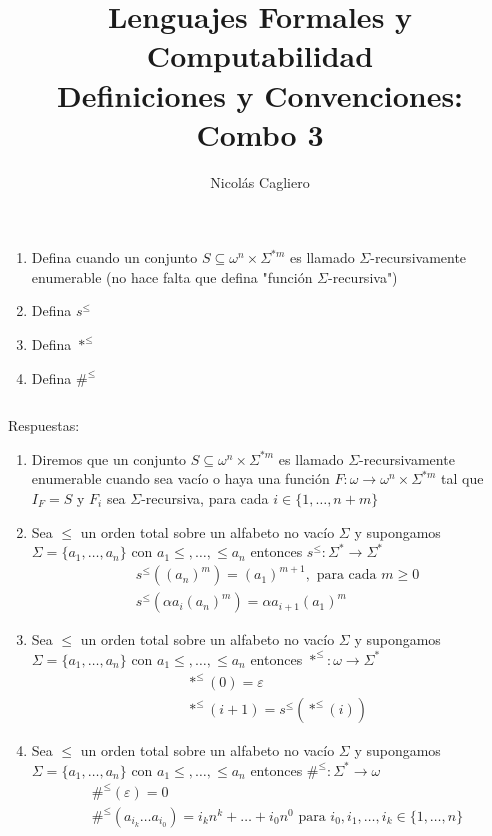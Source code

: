 \documentclass{article}
\title{Lenguajes Formales y Computabilidad \\
        \large Definiciones y Convenciones: Combo 3 }
\author{Nicolás Cagliero}
\begin{document}
\maketitle

\begin{enumerate}
    \item Defina cuando un conjunto $S \subseteq \omega^n \times \Sigma^{*m}$ 
    es llamado $\Sigma$-recursivamente enumerable (no hace falta que defina "función $\Sigma$-recursiva")

    \item Defina $s^{\leq}$
    
    \item Defina $*^{\leq}$
    
    \item Defina $\#^{\leq}$
\end{enumerate}
\(\)
\begin{center}
    Respuestas: 
    \(\)
\end{center}

\begin{enumerate}
    \item Diremos que un conjunto  $S \subseteq \omega^n \times \Sigma^{*m}$ 
    es llamado $\Sigma$-recursivamente enumerable cuando sea vacío o haya
    una función $F : \omega \rightarrow \omega^{n} \times \Sigma^{*m}$
    tal que $I_F = S$ y $F_i$ sea $\Sigma$-recursiva, para cada
    $i \in \{1, \dots, n+m\}$

    \item Sea $\leq$ un orden total sobre un alfabeto no vacío $\Sigma$
    y supongamos $\Sigma = \{a_1, \dots, a_n\}$ con $a_1 \leq,
    \dots, \leq a_n$ entonces
     $s^{\leq} : \Sigma^{*} \rightarrow \Sigma^{*}$
    \begin{align*}
        &s^{\leq}((a_n)^{m}) = (a_1)^{m+1}, \text{ para cada } m \geq 0 \\
        &s^{\leq}(\alpha a_i(a_n)^{m}) = \alpha a_{i+1}(a_1)^{m}
    \end{align*}

    \item Sea $\leq$ un orden total sobre un alfabeto no vacío $\Sigma$
    y supongamos $\Sigma = \{a_1, \dots, a_n\}$ con $a_1 \leq,
    \dots, \leq a_n$ entonces
    $*^{\leq} : \omega \rightarrow \Sigma^{*}$
    \begin{align*}
        &*^{\leq}(0) = \varepsilon \\
        &*^{\leq}(i + 1) = s^{\leq}(*^{\leq}(i))
    \end{align*}

    \item Sea $\leq$ un orden total sobre un alfabeto no vacío $\Sigma$
    y supongamos $\Sigma = \{a_1, \dots, a_n\}$ con $a_1 \leq,
    \dots, \leq a_n$ entonces
    $\#^{\leq} : \Sigma^{*} \rightarrow \omega$
    \begin{align*}
        &\#^{\leq}(\varepsilon) = 0 \\
        &\#^{\leq}(a_{i_k} \dots a_{i_0}) = i_k n^k + \dots + i_0 n^0 
        \text{ para } i_0, i_1, \dots, i_k \in \{1, \dots, n\}
    \end{align*}
\end{enumerate}
\end{document}
